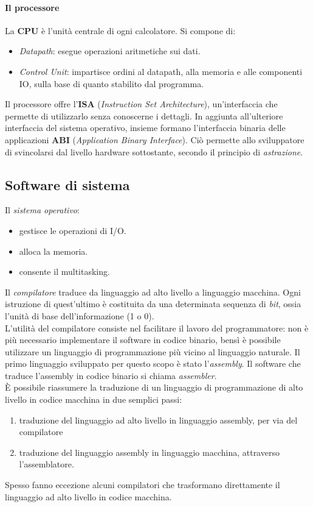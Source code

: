 \paragraph*{Il processore}
La \textbf{CPU} è l'unità centrale di ogni calcolatore. Si compone di:
\begin{itemize}[noitemsep]
	\item \textit{Datapath}: esegue operazioni aritmetiche sui dati.
	\item \textit{Control Unit}: impartisce ordini al datapath, alla memoria e alle componenti IO, sulla base di quanto stabilito dal programma.
\end{itemize}
Il processore offre l'\textbf{ISA} (\textit{Instruction Set Architecture}), un'interfaccia che permette di utilizzarlo senza conoscerne i dettagli. In aggiunta all'ulteriore interfaccia del sistema operativo, insieme formano l'interfaccia binaria delle applicazioni \textbf{ABI} (\textit{Application Binary Interface}). Ciò permette allo sviluppatore di svincolarsi dal livello hardware sottostante, secondo il principio di \textit{astrazione}.

\subsection{Software di sistema}
Il \textit{sistema operativo}:
\begin{itemize}[noitemsep]
	\item gestisce le operazioni di I/O.
	\item alloca la memoria.
	\item consente il multitasking.
\end{itemize}
Il \textit{compilatore} traduce da linguaggio ad alto livello a linguaggio macchina. Ogni istruzione di quest'ultimo è costituita da una determinata sequenza di \textit{bit}, ossia l'unità di base dell'informazione (1 o 0).\\
L'utilità del compilatore consiste nel facilitare il lavoro del programmatore: non è più necessario implementare il software in codice binario, bensì è possibile utilizzare un linguaggio di programmazione più vicino al linguaggio naturale. Il primo linguaggio sviluppato per questo scopo è stato l'\textit{assembly}. Il software che traduce l'assembly in codice binario si chiama \textit{assembler}.\\
\`{E} possibile riassumere la traduzione di un linguaggio di programmazione di alto livello in codice macchina in due semplici passi:
\begin{enumerate}[noitemsep]
	\item traduzione del linguaggio ad alto livello in linguaggio assembly, per via del compilatore
	\item traduzione del linguaggio assembly in linguaggio macchina, attraverso l'assemblatore.
\end{enumerate}
Spesso fanno eccezione alcuni compilatori che trasformano direttamente il linguaggio ad alto livello in codice macchina.

